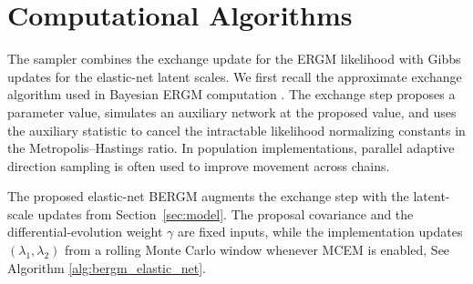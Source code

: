 \documentclass[preprint,12pt,authoryear]{elsarticle}
\begin{document}
\section{Computational Algorithms}\label{sec:algorithms}
The sampler combines the exchange update for the ERGM likelihood with Gibbs
updates for the elastic-net latent scales. We first recall the approximate
exchange algorithm used in Bayesian ERGM computation \citep{caimo2017bayesian}.
The exchange step proposes a parameter value, simulates an auxiliary network at
the proposed value, and uses the auxiliary statistic to cancel the intractable
likelihood normalizing constants in the Metropolis--Hastings ratio. In
population implementations, parallel adaptive direction sampling is often used
to improve movement across chains.


The proposed elastic-net BERGM augments the exchange step with the latent-scale
updates from Section~\ref{sec:model}. The proposal covariance and the
differential-evolution weight \(\gamma\) are fixed inputs, while the
implementation updates \((\lambda_1,\lambda_2)\) from a rolling Monte Carlo
window whenever MCEM is enabled, See Algorithm \ref{alg:bergm_elastic_net}.
\end{document}
